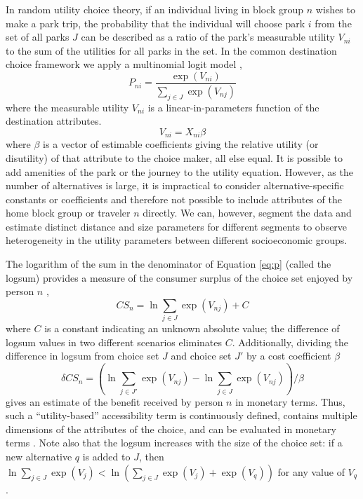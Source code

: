 \documentclass[3p, authoryear, review]{elsarticle} %
\begin{document}
In random utility choice theory, if an individual living in block group \(n\)
wishes to make a park trip, the probability that the individual will choose park
\(i\) from the set of all parks \(J\) can be described as a ratio of the park's
measurable utility \(V_{ni}\) to the sum of the utilities for all parks in the
set. In the common destination choice framework we apply a multinomial logit
model \citep{McFadden1974, Recker1978},
\begin{equation}\label{eq:p}
   P_{ni} = \frac{\exp(V_{ni})}{\sum_{j \in J}\exp(V_{nj})}
\end{equation}
where the measurable utility \(V_{ni}\) is a linear-in-parameters function of
the destination attributes.
\begin{equation}\label{eq:V}
V_{ni} = X_{ni}\beta
\end{equation}
where \(\beta\) is a vector of estimable coefficients giving the relative utility
(or disutility) of that attribute to the choice maker, all else equal. It is
possible to add amenities of the park or the journey to the utility equation.
However, as the number of alternatives is large, it is impractical to consider
alternative-specific constants or coefficients and therefore not possible to
include attributes of the home block group or traveler \(n\) directly. We can,
however, segment the data and estimate distinct distance and size parameters
for different segments to observe heterogeneity in the utility parameters
between different socioeconomic groups.

The logarithm of the sum in the denominator of Equation \ref{eq:p} (called the
logsum) provides a measure of the consumer surplus of the choice set enjoyed by
person \(n\) \citep[\citet{benakiva}]{Williams1977a},
\begin{equation}
CS_n = \ln{{\sum_{j \in J}\exp(V_{nj})}} + C
  \label{eq:logsum}
\end{equation}
where \(C\) is a constant indicating an unknown absolute value; the difference of
logsum values in two different scenarios eliminates \(C\). Additionally, dividing
the difference in logsum from choice set \(J\) and choice set \(J'\) by a cost
coefficient \(\beta\)
\begin{equation}
\delta CS_n = (\ln{\sum_{j \in J'}\exp(V_{nj})} - \ln{\sum_{j \in J}\exp(V_{nj})})/\beta
  \label{eq:deltalogsum}
\end{equation}
gives an estimate of the benefit received by person \(n\) in monetary terms. Thus,
such a ``utility-based'' accessibility term is continuously defined, contains
multiple dimensions of the attributes of the choice, and can be evaluated in
monetary terms \citep{Handy1997, Dong2006}. Note also that the logsum increases
with the size of the choice set: if a new alternative \(q\) is added to \(J\), then
\(\ln\sum_{j\in J}\exp(V_j) < \ln(\sum_{j\in J}\exp(V_j) + \exp(V_q))\) for
any value of \(V_q\) \citep[p.~300]{benakiva}.
\end{document}
